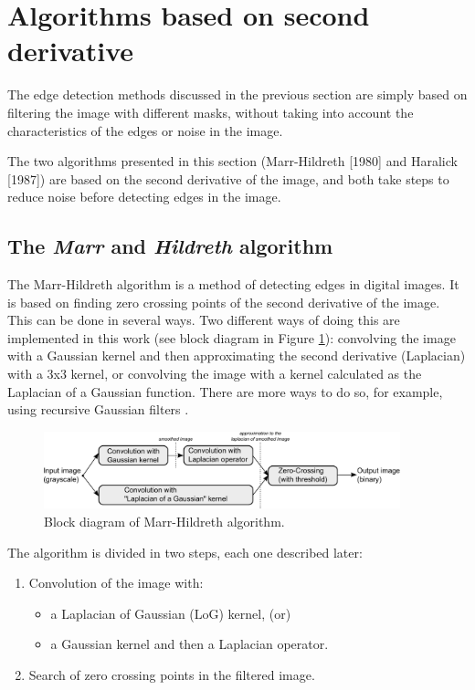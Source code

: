 \documentclass{ipol}
\numberwithin{equation}{section}
\numberwithin{table}{section}
\begin{document}

\section{Algorithms based on second derivative}
\label{sec:second}

The edge detection methods discussed in the previous section are simply based on filtering the 
image with different masks, without taking into account the characteristics of the edges or 
noise in the image. 

The two algorithms presented in this section (Marr-Hildreth \cite{AIM-518} [1980] and Haralick \cite{bb20239} [1987]) 
are based on the second derivative of the image, and both take steps to reduce noise before 
detecting edges in the image.


\subsection{The \textit{Marr} and \textit{Hildreth} algorithm}

The Marr-Hildreth algorithm is a method of detecting edges in digital 
images. It is based on finding zero crossing points of the second derivative
of the image. This can be done in several ways. Two different ways of doing 
this are implemented in this work (see block diagram in Figure 
\ref{fig:blockdiagram2}): convolving the image with a Gaussian kernel and then 
approximating the second derivative (Laplacian) with a 3x3 kernel, or 
convolving the image with a kernel calculated as the Laplacian of a 
Gaussian function. There are more ways to do so, for example, using 
recursive Gaussian filters \cite{Deriche1993Recursively}. 

\begin{figure}[!b]
	\centering
	\includegraphics[width=0.92\textwidth]{blockdiagram2.pdf}
	\caption{Block diagram of Marr-Hildreth algorithm.}
	\label{fig:blockdiagram2}
\end{figure}

The algorithm is divided in two steps, each one described later:
\begin{enumerate}
	\item Convolution of the image with:
	\begin{itemize}
		\item a Laplacian of Gaussian (LoG) kernel, (or)
		\item a Gaussian kernel and then a Laplacian operator.
	\end{itemize}
	\item Search of zero crossing points in the filtered image.
\end{enumerate}
\end{document}
